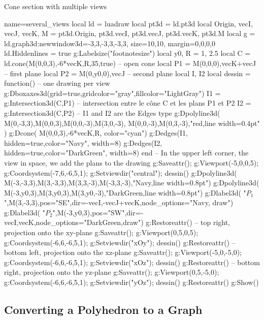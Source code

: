 \begin{demo}{Cone section with multiple views}
\begin{luadraw}{name=several_views}
local ld = luadraw
local pt3d = ld.pt3d
local Origin, vecI, vecJ, vecK, M = pt3d.Origin, pt3d.vecI, pt3d.vecJ, pt3d.vecK, pt3d.M
local g = ld.graph3d:new{window3d={-3,3,-3,3,-3,3}, size={10,10}, margin={0,0,0,0}}
ld.Hiddenlines = true
g:Labelsize("footnotesize")
local y0, R = 1, 2.5
local C = ld.cone(M(0,0,3),-6*vecK,R,35,true) -- open cone
local P1 = {M(0,0,0),vecK+vecJ} -- first plane
local P2 = {M(0,y0,0),vecJ} -- second plane
local I, I2
local dessin = function() -- one drawing per view
    g:Dboxaxes3d({grid=true,gridcolor="gray",fillcolor="LightGray"})
    I1 = g:Intersection3d(C,P1) -- intersection entre le cône C et les plans P1 et P2
    I2 = g:Intersection3d(C,P2) -- I1 and I2 are the Edges type
    g:Dpolyline3d( {{M(0,-3,3),M(0,0,3),M(0,0,-3),M(3,0,-3)}, {M(0,0,-3),M(0,3,-3)}},"red,line width=0.4pt" )
    g:Dcone( M(0,0,3),-6*vecK,R, {color="cyan"})
    g:Dedges(I1, {hidden=true,color="Navy", width=8})
    g:Dedges(I2, {hidden=true,color="DarkGreen", width=8})
end
-- In the upper left corner, the view in space, we add the plans to the drawing
g:Saveattr(); g:Viewport(-5,0,0,5); g:Coordsystem(-7,6,-6,5,1); g:Setviewdir("central"); dessin()
g:Dpolyline3d( {M(-3,-3,3),M(3,-3,3),M(3,3,-3),M(-3,3,-3)},"Navy,line width=0.8pt")
g:Dpolyline3d( {M(-3,y0,3),M(3,y0,3),M(3,y0,-3)},"DarkGreen,line width=0.8pt")
g:Dlabel3d( "$P_1$",M(3,-3,3),{pos="SE",dir={-vecI,-vecJ+vecK},node_options="Navy, draw"})
g:Dlabel3d( "$P_2$",M(-3,y0,3),{pos="SW",dir={-vecI,vecK},node_options="DarkGreen,draw"})
g:Restoreattr()
-- top right, projection onto the xy-plane
g:Saveattr(); g:Viewport(0,5,0,5); g:Coordsystem(-6,6,-6,5,1); g:Setviewdir("xOy"); dessin()
g:Restoreattr()
-- bottom left, projection onto the xz-plane
g:Saveattr(); g:Viewport(-5,0,-5,0); g:Coordsystem(-6,6,-6,5,1); g:Setviewdir("xOz"); dessin()
g:Restoreattr()
-- bottom right, projection onto the yz-plane
g:Saveattr(); g:Viewport(0,5,-5,0); g:Coordsystem(-6,6,-6,5,1); g:Setviewdir("yOz"); dessin()
g:Restoreattr()
g:Show()
\end{luadraw}
\end{demo}

\subsection{Converting a Polyhedron to a Graph}

